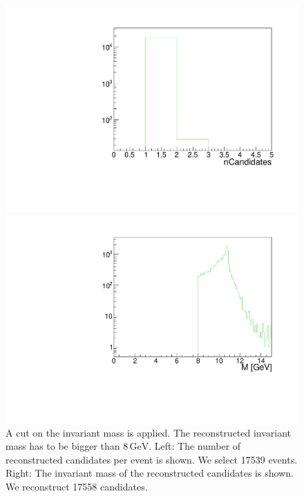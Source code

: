 \documentclass[a4paper,11pt,twosided,final,german,openbib,pdftex,listof=totoc,bibliography=totoc]{scrbook}
\begin{document}
\begin{figure}[h!]
	\centering
	\begin{minipage}[b]{0.45\linewidth}
		\centering
		\includegraphics[width=\textwidth]{Cuts/nCandM.pdf}
	\end{minipage}
	\hspace{0.5cm}
	\begin{minipage}[b]{0.45\linewidth}
		\centering
		\includegraphics[width=\textwidth]{Cuts/MM.pdf}
	\end{minipage}
	\caption[Number Of Candidates And Invariant Mass ($\textrm{M} >8\,\textrm{GeV}$)]{A cut on the invariant mass is applied. The reconstructed invariant mass has to be bigger than $8\,\textrm{GeV}$. Left: The number of reconstructed candidates per event is shown. We select 17539 events. Right: The invariant mass of the reconstructed candidates is shown. We reconstruct 17558 candidates.}
	\label{fig:nCandM}
\end{figure}
\end{document}

